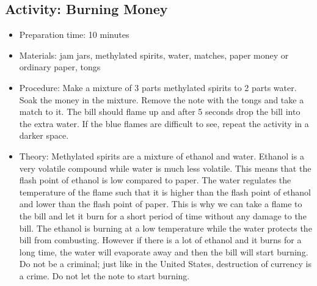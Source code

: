 \begin{itemize}
{\subsection{Activity: Burning Money}
\begin{itemize}
\item{Preparation time: 10 minutes}
\item{Materials: jam jars, methylated spirits, water, matches, paper money or ordinary paper, tongs}
\item{Procedure: Make a mixture of 3 parts methylated spirits to 2 parts water. Soak the money in the mixture. Remove the note with the tongs and take a match to it. The bill should flame up and after 5 seconds drop the bill into the extra water. If the blue flames are difficult to see, repeat the activity in a darker space.}
\item{Theory: Methylated spirits are a mixture of ethanol and water. Ethanol is a very volatile compound while water is much less volatile. This means that the flash point of ethanol is low compared to paper. The water regulates the temperature of the flame such that it is higher than the flash point of ethanol and lower than the flash point of paper. This is why we can take a flame to the bill and let it burn for a short period of time without any damage to the bill. The ethanol is burning at a low temperature while the water protects the bill from combusting. However if there is a lot of ethanol and it burns for a long time, the water will evaporate away and then the bill will start burning. Do not be a criminal; just like in the United States, destruction of currency is a crime. Do not let the note to start burning.}
\end{itemize}

}
\end{itemize}
